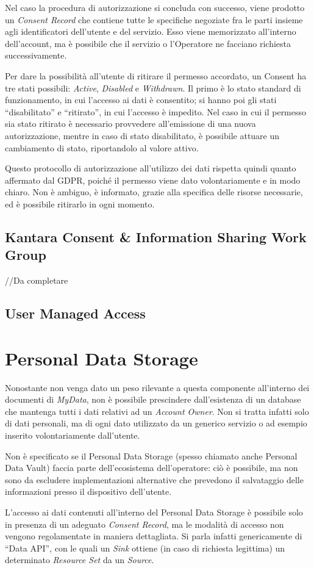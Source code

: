 Nel caso la procedura di autorizzazione si concluda con successo, viene prodotto un \textit{Consent Record} che contiene tutte le specifiche negoziate fra le parti insieme agli identificatori dell’utente e del servizio. Esso viene memorizzato all’interno dell’account, ma \`e possibile che il servizio o l’Operatore ne facciano richiesta successivamente. 

Per dare la possibilit\`a all’utente di ritirare il permesso accordato, un Consent ha tre stati possibili: \textit{Active}, \textit{Disabled} e \textit{Withdrawn}. Il primo \`e lo stato standard di funzionamento, in cui l’accesso ai dati \`e consentito; si hanno poi gli stati “disabilitato” e “ritirato”, in cui l’accesso \`e impedito. Nel caso in cui il permesso sia stato ritirato \`e necessario provvedere all’emissione di una nuova autorizzazione, mentre in caso di stato disabilitato, \`e possibile attuare un cambiamento di stato, riportandolo al valore attivo.

Questo protocollo di autorizzazione all’utilizzo dei dati rispetta quindi quanto affermato dal GDPR, poich\'e il permesso viene dato volontariamente e in modo chiaro. Non \`e ambiguo, \`e informato, grazie alla specifica delle risorse necessarie, ed \`e possibile ritirarlo in ogni momento.

\subsection{Kantara Consent \& Information Sharing Work Group}
//Da completare

\cite{kantaraconsent}

\subsection{User Managed Access}
\cite{uma}

\section{Personal Data Storage}
Nonostante non venga dato un peso rilevante a questa componente all’interno dei documenti di \textit{MyData}, non \`e possibile prescindere dall’esistenza di un database che mantenga tutti i dati relativi ad un \textit{Account Owner}. Non si tratta infatti solo di dati personali, ma di ogni dato utilizzato da un generico servizio o ad esempio inserito volontariamente dall’utente.

Non \`e specificato se il Personal Data Storage (spesso chiamato anche Personal Data Vault) faccia parte dell’ecosistema dell’operatore: ci\`o \`e possibile, ma non sono da escludere implementazioni alternative che prevedono il salvataggio delle informazioni presso il dispositivo dell’utente.

L’accesso ai dati contenuti all’interno del Personal Data Storage \`e possibile solo in presenza di un adeguato \textit{Consent Record}, ma le modalit\`a di accesso non vengono regolamentate in maniera dettagliata. Si parla infatti genericamente di “Data API”, con le quali un \textit{Sink} ottiene (in caso di richiesta legittima) un determinato \textit{Resource Set} da un \textit{Source}.


